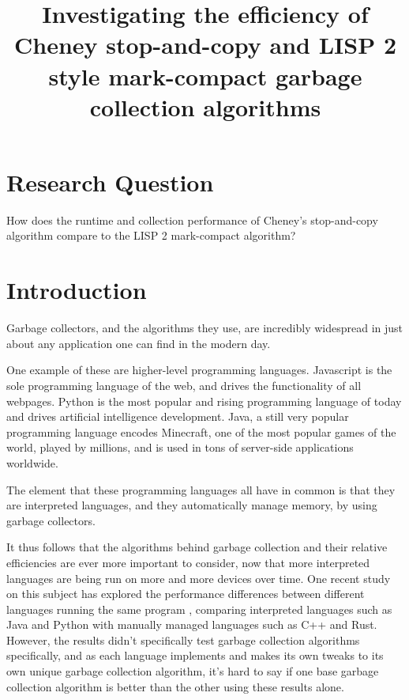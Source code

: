 \documentclass[index]{subfiles}
\begin{document}
\title{Investigating the efficiency of Cheney stop-and-copy and LISP 2 style mark-compact garbage collection algorithms}
\date{}
\author{}
\maketitle

\section{Research Question}

How does the runtime and collection performance of Cheney's stop-and-copy algorithm compare to the LISP 2 mark-compact algorithm?

\section{Introduction}

Garbage collectors, and the algorithms they use, are incredibly widespread in just about any application one can find in the modern day. 

One example of these are higher-level programming languages. Javascript is the sole programming language of the web, and drives the functionality of all webpages. Python is the most popular and rising programming language of today and drives artificial intelligence development. Java, a still very popular programming language encodes Minecraft, one of the most popular games of the world, played by millions, and is used in tons of server-side applications worldwide.

The element that these programming languages all have in common is that they are interpreted languages, and they automatically manage memory, by using garbage collectors.

It thus follows that the algorithms behind garbage collection and their relative efficiencies are ever more important to consider, now that more interpreted languages are being run on more and more devices over time. One recent study on this subject has explored the performance differences between different languages running the same program \cite{programming_languages_electricity}, comparing interpreted languages such as Java and Python with manually managed languages such as C++ and Rust. However, the results didn't specifically test garbage collection algorithms specifically, and as each language implements and makes its own tweaks to its own unique garbage collection algorithm, it's hard to say if one base garbage collection algorithm is better than the other using these results alone.
\end{document}
